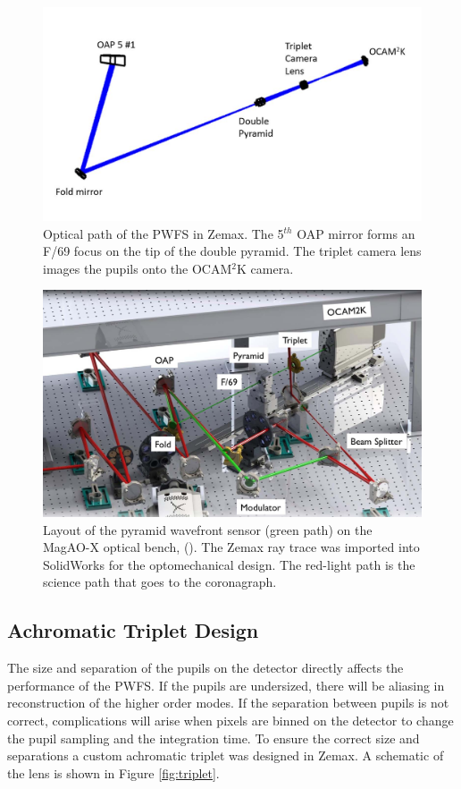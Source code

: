\begin{figure}
    \centering
    \includegraphics[width=.8\textwidth]{Chapter Materials/Chapter Three Materials/layout.jpg}
    \caption{Optical path of the PWFS in Zemax. The 5$^{th}$ OAP mirror forms an F/69 focus on the tip of the double pyramid. The triplet camera lens images the pupils onto the OCAM$^2$K camera.}
    \label{fig:my_label}
\end{figure}

\begin{figure}
    \centering
    \includegraphics[width=.8\textwidth]{Chapter Materials/Chapter Three Materials/PWFSOptoMech.jpg}
    \caption{Layout of the pyramid wavefront sensor (green path) on the MagAO-X optical bench, (\cite{close2018optical}). The Zemax ray trace was imported into SolidWorks for the optomechanical design. The red-light path is the science path that goes to the coronagraph.}
    \label{fig:oplayout}
\end{figure}
	
	
	
	
\subsection{Achromatic Triplet Design}

The size and separation of the pupils on the detector directly affects the performance of the PWFS. If the pupils are undersized, there will be aliasing in reconstruction of the higher order modes. If the separation between pupils is not correct, complications will arise when pixels are binned on the detector to change the pupil sampling and the integration time.  To ensure the correct size and separations a custom achromatic triplet was designed in Zemax. A schematic of the lens is shown in Figure \ref{fig:triplet}. 


